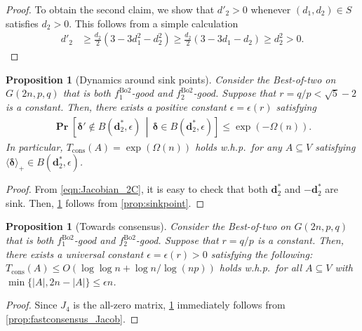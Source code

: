 \documentclass[letterpaper,11pt]{article}
\newtheorem{proposition}[theorem]{Proposition}
\newcommand{\Tcons}{T_{\mathrm{cons}}}
\newcommand{\Btwo}{\mathrm{Bo2}}
\newcommand*{\absp}[1]{\langle #1 \rangle_+}
\renewcommand\Pr{\mathop{\mathbf{Pr}}}
\begin{document}
\begin{proof}
To obtain the second claim, we show that $d'_2>0$ whenever $(d_1,d_2)\in S$ satisfies $d_2>0$.
This follows from a simple calculation 
\begin{align*}
d'_2 &\geq \frac{d_2}{2}(3-3d_1^2-d_2^2) 
\geq \frac{d_2}{2}(3-3d_1-d_2) 
\geq d_2^2
>0.
\end{align*}
\end{proof}
%
\begin{proposition}[Dynamics around sink points] \label{prop:sink_2C}
Consider the Best-of-two on $G(2n,p,q)$ that is both $f^\Btwo_1$-good and $f^\Btwo_2$-good.
Suppose that $r=q/p<\sqrt{5}-2$ is a constant.
Then, there exists a positive constant $\epsilon=\epsilon(r)$ satisfying
\begin{align*}
\Pr\left[{\boldsymbol \delta'}\not\in B(\mathbf{d}_2^*,\epsilon) \,\middle|\, {\boldsymbol \delta}\in B(\mathbf{d}_2^*,\epsilon)\right] \leq \exp(-\Omega(n)).
\end{align*}
%
In particular, 
$\Tcons(A) = \exp(\Omega(n))$ holds w.h.p.~for any $A\subseteq V$ satisfying $\absp{{\boldsymbol \delta}} \in B(\mathbf{d}_2^*,\epsilon)$.
%
\end{proposition}
%
\begin{proof}
From \cref{eqn:Jacobian_2C}, it is easy to check that both $\mathbf{d}^*_2$ and $-\mathbf{d}^*_2$ are sink.
Then, \cref{prop:sink_2C} follows from \cref{prop:sinkpoint}.
\end{proof}
%
\begin{proposition}[Towards consensus] \label{prop:fastconsensus_2C}
Consider the Best-of-two on $G(2n,p,q)$ that is both $f^\Btwo_1$-good and $f^\Btwo_2$-good.
Suppose that $r=q/p$ is a constant.
Then, there exists a universal constant $\epsilon=\epsilon(r)>0$ satisfying the following:
$\Tcons(A)\leq O(\log\log n+\log n/\log (np))$ holds w.h.p.~for all $A\subseteq V$ with $\min\{|A|,2n-|A|\}\leq \epsilon n$.
\end{proposition}
%
\begin{proof}
Since $J_4$ is the all-zero matrix, \cref{prop:fastconsensus_2C} immediately follows from \cref{prop:fastconsensus_Jacob}.
\end{proof}
\end{document}
